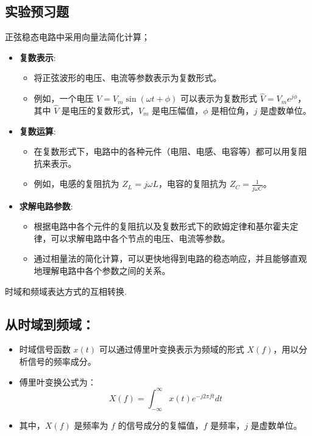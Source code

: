 \documentclass[dvipsnames, svgnames,a4paper,11pt]{article}
\begin{document}
	
	
	
	\subsection{实验预习题}
	
	\begin{question}
		正弦稳态电路中采用向量法简化计算；
	\end{question}
	\begin{itemize}
		\item \textbf{复数表示}:
		  \begin{itemize}
			\item 将正弦波形的电压、电流等参数表示为复数形式。
			\item 例如，一个电压 $V = V_m \sin(\omega t + \phi)$ 可以表示为复数形式 $\hat{V} = V_m e^{j\phi}$，其中 $\hat{V}$ 是电压的复数形式，$V_m$ 是电压幅值，$\phi$ 是相位角，$j$ 是虚数单位。
		  \end{itemize}
		  
		\item \textbf{复数运算}:
		  \begin{itemize}
			\item 在复数形式下，电路中的各种元件（电阻、电感、电容等）都可以用复阻抗来表示。
			\item 例如，电感的复阻抗为 $Z_L = j\omega L$，电容的复阻抗为 $Z_C = \frac{1}{j\omega C}$。
		  \end{itemize}
		  
		\item \textbf{求解电路参数}:
		  \begin{itemize}
			\item 根据电路中各个元件的复阻抗以及复数形式下的欧姆定律和基尔霍夫定律，可以求解电路中各个节点的电压、电流等参数。
			\item 通过相量法的简化计算，可以更快地得到电路的稳态响应，并且能够直观地理解电路中各个参数之间的关系。
		  \end{itemize}
	  \end{itemize}
	\begin{question}
		时域和频域表达方式的互相转换.
	\end{question}
	\subsection*{从时域到频域：}
\begin{itemize}
  \item 时域信号函数 $x(t)$ 可以通过傅里叶变换表示为频域的形式 $X(f)$，用以分析信号的频率成分。
  \item 傅里叶变换公式为：
    \[
    X(f) = \int_{-\infty}^{\infty} x(t)e^{-j2\pi ft} dt
    \]
  \item 其中，$X(f)$ 是频率为 $f$ 的信号成分的复幅值，$f$ 是频率，$j$ 是虚数单位。
\end{itemize}
\end{document}
